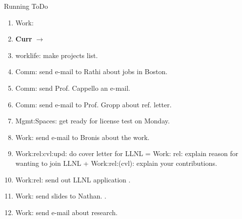 \begin{columns}
\begin{column}{0.6\linewidth}
\begin{block}{Running ToDo}
\begin{enumerate}
        I’ve sent a request for the letter through the portal to apply for the
        program. Let me know if you can write the letter for me when
        you can.
        
        Vivek

TODO:L2: ordering of first paragraph. 

TODO:L3: explanation of previous work. 

TODO:L2: Explaining that a reference from Prof. Gropp will make the
application strong VS [OMIT] -done  

TODO:L0: Talking about relevance of Prof. Gropp's recommendation
letter. 

TODO:L0: Explain deadline. 

TODO:L4: Univ. of Southern California/ ISI 

TODO:L4: Where to say I've sent a request for the letter through the
portal to apply. 

\item \tiny Work: 

      \item \tiny \textbf{Curr} $\rightarrow$ 
      \item \tiny worklife: make projects list.  


      \item \tiny Comm: send e-mail to Rathi about jobs in Boston. 

        \item \tiny Comm: send Prof. Cappello an e-mail. 
      \item \tiny Comm: send e-mail to Prof. Gropp about ref. letter. 

      \item \tiny Mgmt:Spaces: get ready for license test on Monday.

      \item \tiny Work: send e-mail to Bronis about the work. 

      \item \tiny Work:rel:cvl:upd: do cover letter for LLNL = Work: rel:
        explain reason for wanting to join LLNL + Work:rel:(cvl):
        explain your contributions.    \dl{ }         
      \item \tiny Work:rel: send out LLNL application 
        . 

      \item \tiny Work: send slides to Nathan. .  

      \item \tiny Work: send e-mail about research. 


\end{enumerate}
\end{block}
\end{column}
\end{columns}
